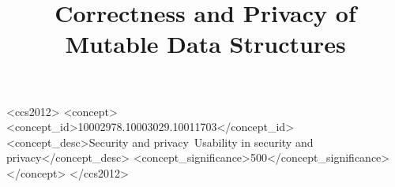 \documentclass[sigconf, anonymous]{acmart}
\begin{document}
\title{Correctness and Privacy of Mutable Data Structures}



\begin{CCSXML}
<ccs2012>
<concept>
<concept_id>10002978.10003029.10011703</concept_id>
<concept_desc>Security and privacy~Usability in security and privacy</concept_desc>
<concept_significance>500</concept_significance>
</concept>
</ccs2012>
\end{CCSXML}



\maketitle




\end{document}
